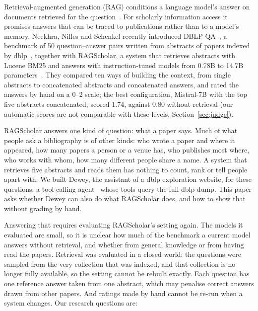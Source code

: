 \documentclass[conference]{IEEEtran}
\begin{document}
Retrieval-augmented generation (RAG) conditions a language model's answer on documents retrieved for
the question~\cite{lewis2020rag,gao2023ragsurvey}. For scholarly information access it promises answers
that can be traced to publications rather than to a model's memory. Neekhra, Nilles and Schenkel recently
introduced DBLP-QA~\cite{neekhra2026ragscholar}, a benchmark of 50 question--answer pairs written from abstracts of papers indexed by
dblp~\cite{ley2009dblp}, together with RAGScholar, a system that retrieves abstracts with Lucene BM25 and
answers with instruction-tuned models from 0.78B to 14.7B parameters~\cite{neekhra2026ragscholar}. They
compared ten ways of building the context, from single abstracts to concatenated abstracts and
concatenated answers, and rated the answers by hand on a 0--2 scale; the best configuration, Mistral-7B
with the top five abstracts concatenated, scored 1.74, against 0.80 without retrieval (our automatic scores are not comparable with these levels, Section~\ref{sec:judge}).

RAGScholar answers one kind of question: what a paper says. Much of what people ask a bibliography is of
other kinds: who wrote a paper and where it appeared, how many papers a person or a venue has, who
publishes most where, who works with whom, how many different people share a name. A system that
retrieves five abstracts and reads them has nothing to count, rank or tell people apart with. We built
Dewey, the assistant of a dblp exploration website, for these questions: a tool-calling
agent~\cite{schick2023toolformer,yao2023react} whose tools query the full dblp dump. This paper asks
whether Dewey can also do what RAGScholar does, and how to show that without grading by hand.

Answering that requires evaluating RAGScholar's setting again. The models it evaluated are small, so it
is unclear how much of the benchmark a current model answers without retrieval, and whether from general
knowledge or from having read the papers. Retrieval was evaluated in a closed world: the questions were
sampled from the very collection that was indexed, and that collection is no longer fully available, so
the setting cannot be rebuilt exactly. Each question has one reference answer taken from one abstract, which may
penalise correct answers drawn from other papers. And ratings made by hand cannot be re-run when a system
changes. Our research questions are:
\end{document}
